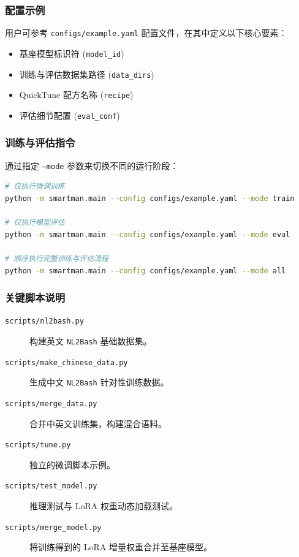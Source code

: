 \documentclass[UTF8,a4paper,12pt]{ctexart}
\begin{document}
\subsubsection{配置示例}
用户可参考 \texttt{configs/example.yaml} 配置文件，在其中定义以下核心要素：
\begin{itemize}
    \item 基座模型标识符 (\texttt{model\_id})
    \item 训练与评估数据集路径 (\texttt{data\_dirs})
    \item QuickTune 配方名称 (\texttt{recipe})
    \item 评估细节配置 (\texttt{eval\_conf})
\end{itemize}

\subsubsection{训练与评估指令}
通过指定 \texttt{--mode} 参数来切换不同的运行阶段：

\begin{lstlisting}[language=bash]
# 仅执行微调训练
python -m smartman.main --config configs/example.yaml --mode train

# 仅执行模型评估
python -m smartman.main --config configs/example.yaml --mode eval

# 顺序执行完整训练与评估流程
python -m smartman.main --config configs/example.yaml --mode all
\end{lstlisting}

\subsubsection{关键脚本说明}
\begin{description}
    \item[\texttt{scripts/nl2bash.py}] 构建英文 \texttt{NL2Bash} 基础数据集。
    \item[\texttt{scripts/make\_chinese\_data.py}] 生成中文 \texttt{NL2Bash} 针对性训练数据。
    \item[\texttt{scripts/merge\_data.py}] 合并中英文训练集，构建混合语料。
    \item[\texttt{scripts/tune.py}] 独立的微调脚本示例。
    \item[\texttt{scripts/test\_model.py}] 推理测试与 LoRA 权重动态加载测试。
    \item[\texttt{scripts/merge\_model.py}] 将训练得到的 LoRA 增量权重合并至基座模型。
\end{description}
\end{document}
